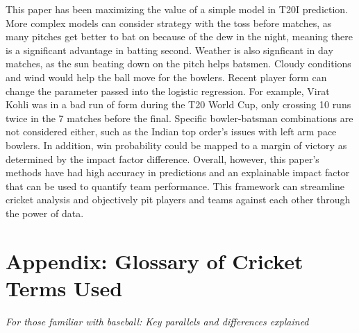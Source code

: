 \documentclass{article}[12pt]
\begin{document}
This paper has been maximizing the value of a simple model in T20I prediction. More complex models can consider strategy with the toss before matches, as many pitches get better to bat on because of the dew in the night, meaning there is a significant advantage in batting second. \parencite{krishnaswamy_2022_the} Weather is also signficant in day matches, as the sun beating down on the pitch helps batsmen. Cloudy conditions and wind would help the ball move for the bowlers. Recent player form can change the parameter passed into the logistic regression. For example, Virat Kohli was in a bad run of form during the T20 World Cup, only crossing 10 runs twice in the 7 matches before the final. Specific bowler-batsman combinations are not considered either, such as the Indian top order's issues with left arm pace bowlers. \parencite{iyer_2023_why} In addition, win probability could be mapped to a margin of victory as determined by the impact factor difference. Overall, however, this paper's methods have had high accuracy in predictions and an explainable impact factor that can be used to quantify team performance. This framework can streamline cricket analysis and objectively pit players and teams against each other through the power of data.











\clearpage
{}

\printbibliography
\pagebreak
{}
\section*{Appendix: Glossary of Cricket Terms Used}
\label{appendix:terms}

\textit{For those familiar with baseball: Key parallels and differences explained}
\end{document}
